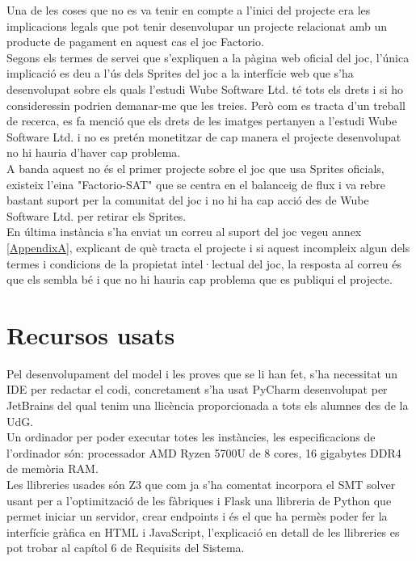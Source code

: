 Una de les coses que no es va tenir en compte a l'inici del projecte era les implicacions legals que pot tenir desenvolupar un projecte relacionat amb un producte de pagament en aquest cas el joc Factorio.\\
Segons els termes de servei que s'expliquen a la pàgina web oficial del joc, l'única implicació es deu a l'ús dels Sprites del joc a la interfície web que s'ha desenvolupat sobre els quals l'estudi Wube Software Ltd. té tots els drets i si ho consideressin podrien demanar-me que les treies. Però com es tracta d'un treball de recerca, es fa menció que els drets de les imatges pertanyen a l'estudi Wube Software Ltd. i no es pretén monetitzar de cap manera el projecte desenvolupat no hi hauria d'haver cap problema.\\
A banda aquest no és el primer projecte sobre el joc que usa Sprites oficials, existeix l'eina "Factorio-SAT" que se centra en el balanceig de flux i va rebre bastant suport per la comunitat del joc i no hi ha cap acció des de Wube Software Ltd. per retirar els Sprites.\\

En última instància s'ha enviat un correu al suport del joc vegeu annex \ref{AppendixA}, explicant de què tracta el projecte i si aquest incompleix algun dels termes i condicions de la propietat intel·lectual del joc, la resposta al correu és que els sembla bé i que no hi hauria cap problema que es publiqui el projecte.

\section{Recursos usats}
Pel desenvolupament del model i les proves que se li han fet, s'ha necessitat un IDE per redactar el codi, concretament s'ha usat PyCharm desenvolupat per JetBrains del qual tenim una llicència proporcionada a tots els alumnes des de la UdG.\\
Un ordinador per poder executar totes les instàncies, les especificacions de l'ordinador són: processador AMD Ryzen 5700U de 8 cores, 16 gigabytes DDR4 de memòria RAM.\\
Les llibreries usades són Z3 que com ja s'ha comentat incorpora el SMT solver usant per a l'optimització de les fàbriques i Flask una llibreria de Python que permet iniciar un servidor, crear endpoints i és el que ha permès poder fer la interfície gràfica en HTML i JavaScript, l'explicació en detall de les llibreries es pot trobar al capítol 6 de Requisits del Sistema.

